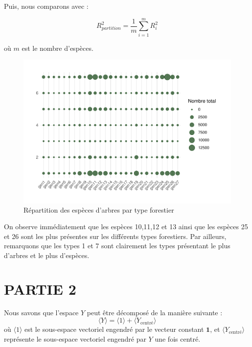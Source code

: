 \documentclass[
]{article}
\begin{document}
Puis, nous comparons avec :

\[
R^2_{partition} = \frac{1}{m} \sum_{i=1}^{m} R^2_{i}
\]

où \(m\) est le nombre d'espèces.

\begin{figure}[ht!]

{\centering \includegraphics{EL_MAZZOUJI_Wahel_GILLET_Louison_ADM_DM1_files/figure-latex/especes_forest-1} 

}

\caption{Répartition des espèces d'arbres par type forestier}\label{fig:especes_forest}
\end{figure}

On observe immédiatement que les espèces 10,11,12 et 13 ainsi que les
espèces 25 et 26 sont les plus présentes sur les différents types
forestiers. Par ailleurs, remarquons que les types 1 et 7 sont
clairement les types présentant le plus d'arbres et le plus d'espèces.

\newpage

\hypertarget{partie-2}{%
\section{PARTIE 2}\label{partie-2}}

Nous savons que l'espace \(Y\) peut être décomposé de la manière
suivante : \[
\langle Y \rangle = \langle 1 \rangle + \langle Y_{\text{centré}} \rangle
\] où \(\langle 1 \rangle\) est le sous-espace vectoriel engendré par le
vecteur constant \(\mathbf{1}\), et
\(\langle Y_{\text{centré}} \rangle\) représente le sous-espace
vectoriel engendré par \(Y\) une fois centré.
\end{document}
